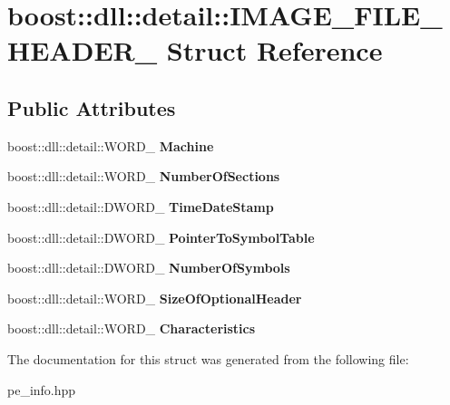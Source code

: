 \hypertarget{a01588}{}\section{boost\+:\+:dll\+:\+:detail\+:\+:I\+M\+A\+G\+E\+\_\+\+F\+I\+L\+E\+\_\+\+H\+E\+A\+D\+E\+R\+\_\+ Struct Reference}
\label{a01588}
\subsection*{Public Attributes}
\begin{DoxyCompactItemize}
\item 
\mbox{\label{a01588_a74d0493f559c1790ca07841a9f433d68}} 
boost\+::dll\+::detail\+::\+W\+O\+R\+D\+\_\+ {\bfseries Machine}
\item 
\mbox{\label{a01588_a2e08f6cff4a1d7c7cc4edd0b7376905c}} 
boost\+::dll\+::detail\+::\+W\+O\+R\+D\+\_\+ {\bfseries Number\+Of\+Sections}
\item 
\mbox{\label{a01588_a64d58055b32aa8c8f5e759a7cd7041a0}} 
boost\+::dll\+::detail\+::\+D\+W\+O\+R\+D\+\_\+ {\bfseries Time\+Date\+Stamp}
\item 
\mbox{\label{a01588_a55b924300db035a900d8acfcb42ed53f}} 
boost\+::dll\+::detail\+::\+D\+W\+O\+R\+D\+\_\+ {\bfseries Pointer\+To\+Symbol\+Table}
\item 
\mbox{\label{a01588_a68ef366c62acd1c494b34f051c3741d9}} 
boost\+::dll\+::detail\+::\+D\+W\+O\+R\+D\+\_\+ {\bfseries Number\+Of\+Symbols}
\item 
\mbox{\label{a01588_a1faf8ff2d3cd8befadadcf3fbf17c9c2}} 
boost\+::dll\+::detail\+::\+W\+O\+R\+D\+\_\+ {\bfseries Size\+Of\+Optional\+Header}
\item 
\mbox{\label{a01588_aa0066509ff8a4daf18e369b08880a1b2}} 
boost\+::dll\+::detail\+::\+W\+O\+R\+D\+\_\+ {\bfseries Characteristics}
\end{DoxyCompactItemize}


The documentation for this struct was generated from the following file\+:\begin{DoxyCompactItemize}
\item 
pe\+\_\+info.\+hpp\end{DoxyCompactItemize}
